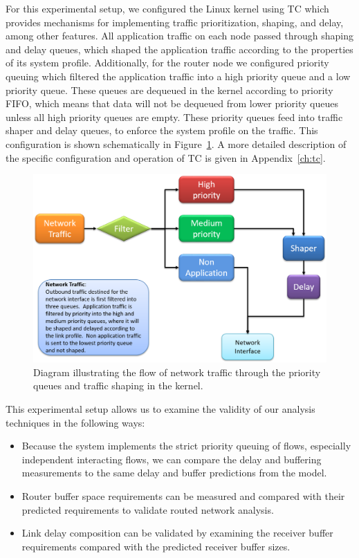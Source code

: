 For this experimental setup, we configured the Linux kernel using
TC\cite{linux_tc} which provides mechanisms for implementing traffic
prioritization, shaping, and delay, among other features. All
application traffic on each node passed through shaping and delay
queues, which shaped the application traffic according to the
properties of its system profile.  Additionally, for the router node
we configured priority queuing which filtered the application traffic
into a high priority queue and a low priority queue.  These queues are
dequeued in the kernel according to priority FIFO, which means that
data will not be dequeued from lower priority queues unless all high
priority queues are empty.  These priority queues feed into traffic
shaper and delay queues, to enforce the system profile on the
traffic.  This configuration is shown schematically in
Figure~\ref{fig:network_traffic}.  A more detailed description of the
specific configuration and operation of TC is given in
Appendix~\ref{ch:tc}.

\begin{figure}[ht!]
  \centering
  \includegraphics[width=\textwidth]{./figs/network_traffic.png}
  \caption{Diagram illustrating the flow of network traffic through
    the priority queues and traffic shaping in the kernel.}
  \label{fig:network_traffic}
\end{figure}

This experimental setup allows us to examine the validity of our
analysis techniques in the following ways:

\begin{itemize}
  \item Because the system implements the strict priority queuing of
    flows, especially independent interacting flows, we can compare
    the delay and buffering measurements to the same delay and buffer
    predictions from the model.
  \item Router buffer space requirements can be measured and compared
    with their predicted requirements to validate routed network
    analysis.
  \item Link delay composition can be validated by examining the
    receiver buffer requirements compared with the predicted receiver
    buffer sizes.  
\end{itemize}

